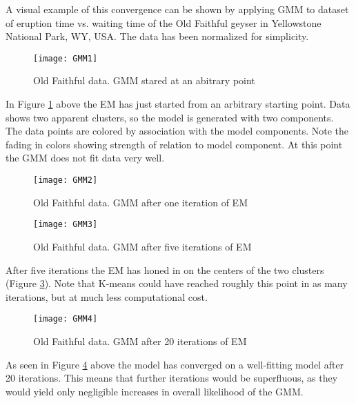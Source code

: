 A visual example of this convergence can be shown by applying GMM to dataset of eruption time vs. waiting time of the Old Faithful geyser in Yellowstone National Park, WY, USA.
The data has been normalized for simplicity. 
\\

\begin{figure}[H]
\centering
\texttt{[image: GMM1]}
\caption{Old Faithful data. GMM stared at an abitrary point}
\label{fig:GMM1}
\end{figure}

In Figure \ref{fig:GMM1} above the EM has just started from an arbitrary starting point.
Data shows two apparent clusters, so the model is generated with two components.
The data points are colored by association with the model components.
Note the fading in colors showing strength of relation to model component.
At this point the GMM does not fit data very well.

\begin{figure}[H]
\centering
\texttt{[image: GMM2]}
\caption{Old Faithful data. GMM after one iteration of EM}
\label{fig:GMM2}
\end{figure}

\begin{figure}[H]
\centering
\texttt{[image: GMM3]}
\caption{Old Faithful data. GMM after five iterations of EM}
\label{fig:GMM3}
\end{figure}

After five iterations the EM has honed in on the centers of the two clusters (Figure \ref{fig:GMM3}).
Note that K-means could have reached roughly this point in as many iterations, but at much less computational cost.

\begin{figure}[H]
\centering
\texttt{[image: GMM4]}
\caption{Old Faithful data. GMM after 20 iterations of EM}
\label{fig:GMM4}
\end{figure}

As seen in Figure \ref{fig:GMM4} above the model has converged on a well-fitting model after 20 iterations.
This means that further iterations would be superfluous, as they would yield only negligible increases in overall likelihood of the GMM. 


